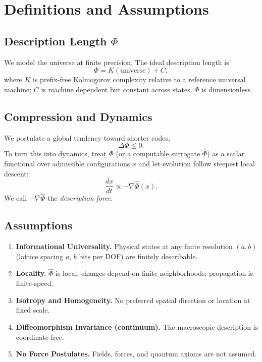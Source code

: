 \documentclass[aps,preprint,onecolumn,longbibliography,nofootinbib]{revtex4-2}
\numberwithin{equation}{section}        %
\begin{document}
\section{Definitions and Assumptions}

\subsection{Description Length $\Phi$}
We model the universe at finite precision. The ideal description length is
\begin{equation}
\Phi = K(\text{universe}) + C, \label{eq:Kdef}
\end{equation}
where $K$ is prefix-free Kolmogorov complexity relative to a reference universal machine; $C$ is machine dependent but constant across states. $\Phi$ is dimensionless.

\subsection{Compression and Dynamics}
We postulate a global tendency toward shorter codes,
\begin{equation}
\Delta \Phi \le 0. \label{eq:compressive}
\end{equation}
To turn this into dynamics, treat $\Phi$ (or a computable surrogate $\widehat\Phi$) as a scalar functional over admissible configurations $x$ and let evolution follow steepest local descent:
\begin{equation}
\frac{dx}{dt} \propto -\nabla \widehat\Phi(x). \label{eq:desc}
\end{equation}
We call $-\nabla\widehat\Phi$ the \emph{description force}.

\subsection*{Assumptions}
\begin{enumerate}
\item \textbf{Informational Universality.} Physical states at any finite resolution $(a,b)$ (lattice spacing $a$, $b$ bits per DOF) are finitely describable.
\item \textbf{Locality.} $\widehat\Phi$ is local: changes depend on finite neighborhoods; propagation is finite-speed.
\item \textbf{Isotropy and Homogeneity.} No preferred spatial direction or location at fixed scale.
\item \textbf{Diffeomorphism Invariance (continuum).} The macroscopic description is coordinate-free.
\item \textbf{No Force Postulates.} Fields, forces, and quantum axioms are not assumed.
\end{enumerate}
\end{document}
